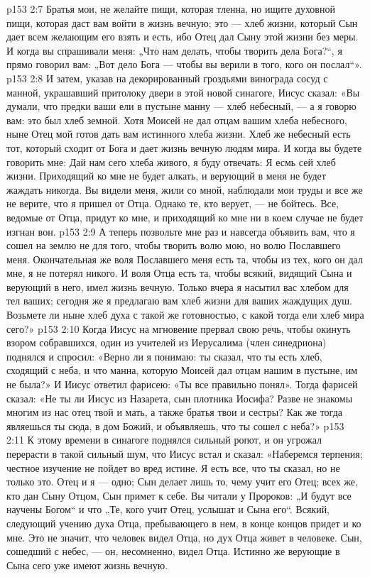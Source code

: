 \vs p153 2:7 Братья мои, не желайте пищи, которая тленна, но ищите духовной пищи, которая даст вам войти в жизнь вечную; это --- хлеб жизни, который Сын дает всем желающим его взять и есть, ибо Отец дал Сыну этой жизни без меры. И когда вы спрашивали меня: „Что нам делать, чтобы творить дела Бога?“, я прямо говорил вам: „Вот дело Бога --- чтобы вы верили в того, кого он послал“».
\vs p153 2:8 И затем, указав на декорированный гроздьями винограда сосуд с манной, украшавший притолоку двери в этой новой синагоге, Иисус сказал: «Вы думали, что предки ваши ели в пустыне манну --- хлеб небесный, --- а я говорю вам: это был хлеб земной. Хотя Моисей не дал отцам вашим хлеба небесного, ныне Отец мой готов дать вам истинного хлеба жизни. Хлеб же небесный есть тот, который сходит от Бога и дает жизнь вечную людям мира. И когда вы будете говорить мне: Дай нам сего хлеба живого, я буду отвечать: Я есмь сей хлеб жизни. Приходящий ко мне не будет алкать, и верующий в меня не будет жаждать никогда. Вы видели меня, жили со мной, наблюдали мои труды и все же не верите, что я пришел от Отца. Однако те, кто верует, --- не бойтесь. Все, ведомые от Отца, придут ко мне, и приходящий ко мне ни в коем случае не будет изгнан вон.
\vs p153 2:9 А теперь позвольте мне раз и навсегда объявить вам, что я сошел на землю не для того, чтобы творить волю мою, но волю Пославшего меня. Окончательная же воля Пославшего меня есть та, чтобы из тех, кого он дал мне, я не потерял никого. И воля Отца есть та, чтобы всякий, видящий Сына и верующий в него, имел жизнь вечную. Только вчера я насытил вас хлебом для тел ваших; сегодня же я предлагаю вам хлеб жизни для ваших жаждущих душ. Возьмете ли ныне хлеб духа с такой же готовностью, с какой тогда ели хлеб мира сего?»
\vs p153 2:10 \pc Когда Иисус на мгновение прервал свою речь, чтобы окинуть взором собравшихся, один из учителей из Иерусалима (член синедриона) поднялся и спросил: «Верно ли я понимаю: ты сказал, что ты есть хлеб, сходящий с неба, и что манна, которую Моисей дал отцам нашим в пустыне, им не была?» И Иисус ответил фарисею: «Ты все правильно понял». Тогда фарисей сказал: «Не ты ли Иисус из Назарета, сын плотника Иосифа? Разве не знакомы многим из нас отец твой и мать, а также братья твои и сестры? Как же тогда являешься ты сюда, в дом Божий, и объявляешь, что ты сошел с неба?»
\vs p153 2:11 К этому времени в синагоге поднялся сильный ропот, и он угрожал перерасти в такой сильный шум, что Иисус встал и сказал: «Наберемся терпения; честное изучение не пойдет во вред истине. Я есть все, что ты сказал, но не только это. Отец и я --- одно; Сын делает лишь то, чему учит его Отец; всех же, кто дан Сыну Отцом, Сын примет к себе. Вы читали у Пророков: „И будут все научены Богом“ и что „Те, кого учит Отец, услышат и Сына его“. Всякий, следующий учению духа Отца, пребывающего в нем, в конце концов придет и ко мне. Это не значит, что человек видел Отца, но дух Отца живет в человеке. Сын, сошедший с небес, --- он, несомненно, видел Отца. Истинно же верующие в Сына сего уже имеют жизнь вечную.
